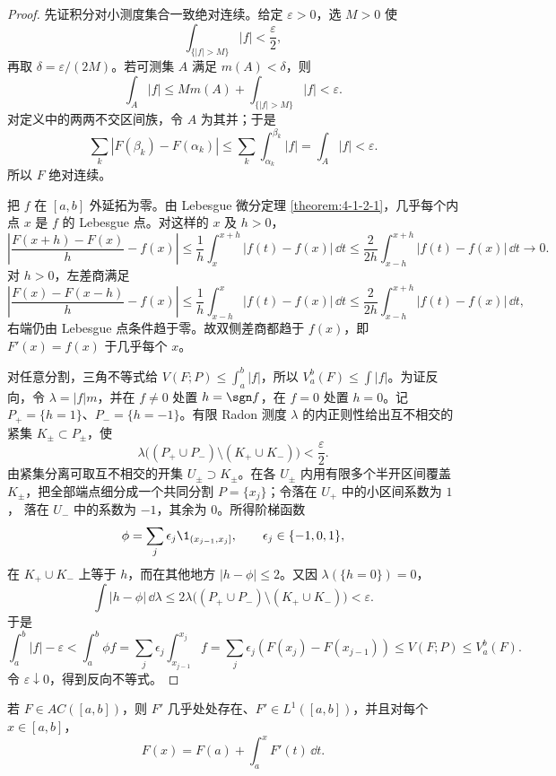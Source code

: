 \begin{proof}
先证积分对小测度集合一致绝对连续。给定 $\varepsilon>0$，选 $M>0$ 使
\[
 \int_{\{|f|>M\}}|f|<\frac\varepsilon2,
\]
再取 $\delta=\varepsilon/(2M)$。若可测集 $A$ 满足 $m(A)<\delta$，则
\begin{equation}\label{eq:4-2-integral-absolute-continuity}
 \int_A|f|
 \le M m(A)+\int_{\{|f|>M\}}|f|<\varepsilon.
\end{equation}
对定义中的两两不交区间族，令 $A$ 为其并；于是
\[
 \sum_k|F(\beta_k)-F(\alpha_k)|
 \le\sum_k\int_{\alpha_k}^{\beta_k}|f|
 =\int_A|f|<\varepsilon.
\]
所以 $F$ 绝对连续。

把 $f$ 在 $[a,b]$ 外延拓为零。由 Lebesgue 微分定理
\cref{theorem:4-1-2-1}，几乎每个内点 $x$ 是 $f$ 的 Lebesgue 点。对这样的 $x$ 及
$h>0$，
\[
 \left|\frac{F(x+h)-F(x)}h-f(x)\right|
 \le\frac1h\int_x^{x+h}|f(t)-f(x)|\,\dd t
 \le\frac2{2h}\int_{x-h}^{x+h}|f(t)-f(x)|\,\dd t\longrightarrow0.
\]
对 $h>0$，左差商满足
\[
 \left|\frac{F(x)-F(x-h)}h-f(x)\right|
 \le \frac1h\int_{x-h}^{x}|f(t)-f(x)|\,\dd t
 \le \frac2{2h}\int_{x-h}^{x+h}|f(t)-f(x)|\,\dd t,
\]
右端仍由 Lebesgue 点条件趋于零。故双侧差商都趋于 $f(x)$，即
$F'(x)=f(x)$ 于几乎每个 $x$。

对任意分割，三角不等式给
$V(F;P)\le\int_a^b|f|$，所以 $V_a^b(F)\le\int|f|$。为证反向，令
$\lambda=|f|m$，并在 $f\ne0$ 处置 $h=\sgn f$，在 $f=0$ 处置 $h=0$。记
$P_+=\{h=1\}$、$P_-=\{h=-1\}$。有限 Radon 测度 $\lambda$ 的内正则性给出互不相交的紧集
$K_\pm\subset P_\pm$，使
\[
 \lambda\bigl((P_+\cup P_-)\setminus(K_+\cup K_-)\bigr)<\frac\varepsilon2.
\]
由紧集分离可取互不相交的开集 $U_\pm\supset K_\pm$。在各 $U_\pm$ 内用有限多个半开区间覆盖
$K_\pm$，把全部端点细分成一个共同分割 $P=\{x_j\}$；令落在 $U_+$ 中的小区间系数为 $1$，
落在 $U_-$ 中的系数为 $-1$，其余为 $0$。所得阶梯函数
\[
 \phi=\sum_j\epsilon_j\1_{(x_{j-1},x_j]},\qquad
 \epsilon_j\in\{-1,0,1\},
\]
在 $K_+\cup K_-$ 上等于 $h$，而在其他地方 $|h-\phi|\le2$。又因
$\lambda(\{h=0\})=0$，
\[
 \int|h-\phi|\,\dd\lambda
 \le2\lambda\bigl((P_+\cup P_-)\setminus(K_+\cup K_-)\bigr)<\varepsilon.
\]
于是
\[
 \int_a^b|f|-\varepsilon
 <\int_a^b\phi f
 =\sum_j\epsilon_j\int_{x_{j-1}}^{x_j}f
 =\sum_j\epsilon_j(F(x_j)-F(x_{j-1}))
 \le V(F;P)\le V_a^b(F).
\]
令 $\varepsilon\downarrow0$，得到反向不等式。
\end{proof}

\begin{theorem}\label{theorem:4-2-3-2}
若 $F\in AC([a,b])$，则 $F'$ 几乎处处存在、$F'\in L^1([a,b])$，并且对每个
$x\in[a,b]$，
\begin{equation}\label{eq:4-2-ftc-ii}
 F(x)=F(a)+\int_a^xF'(t)\,\dd t.
\end{equation}
\end{theorem}

